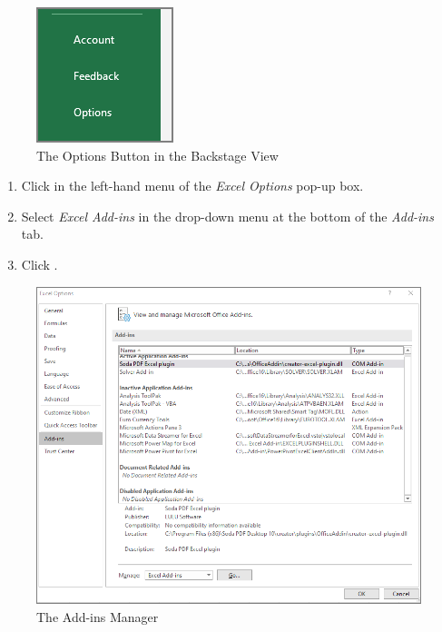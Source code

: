 \begin{figure}[H]
\centering
\includegraphics[width=\maxwidth{.40\linewidth}]{gfx/ch08_fig70}
\caption{The Options Button in the Backstage View}
\label{08:fig70}
\end{figure}

\begin{enumerate}[resume]	
	
	\item Click  in the left-hand menu of the \textit{Excel Options} pop-up box.
	\item Select \textit{Excel Add-ins} in the drop-down menu at the bottom of the \textit{Add-ins} tab.
	\item Click .
	
\end{enumerate}

\begin{figure}[H]
\centering
\includegraphics[width=\maxwidth{.95\linewidth}]{gfx/ch08_fig71}
\caption{The Add-ins Manager}
\label{08:fig71}
\end{figure}

